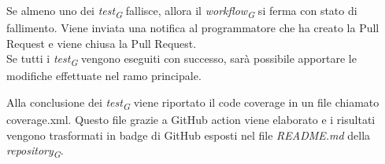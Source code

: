 Se almeno uno dei \textit{test}\textsubscript{\textit{G}} fallisce, allora il \textit{workflow}\textsubscript{\textit{G}} si ferma con stato di fallimento. Viene inviata una notifica al programmatore che ha creato la Pull Request e viene chiusa la Pull Request. \\
Se tutti i \textit{test}\textsubscript{\textit{G}} vengono eseguiti con successo, sarà possibile apportare le modifiche effettuate nel ramo principale.

\vspace{0.2cm}

Alla conclusione dei \textit{test}\textsubscript{\textit{G}} viene riportato il code coverage in un file chiamato coverage.xml. Questo file grazie a GitHub action viene elaborato e i risultati vengono trasformati in badge di GitHub esposti nel file \textit{README.md} della \textit{repository}\textsubscript{\textit{G}}.

